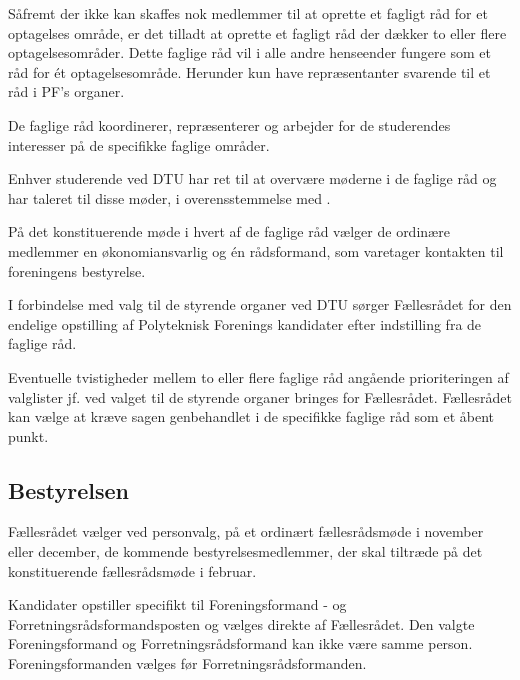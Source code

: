 \begin{list}
\item \label{L4:flereraad} Såfremt der ikke kan skaffes nok medlemmer til at oprette et fagligt råd for et optagelses område, er det tilladt at oprette et fagligt råd der dækker to eller flere optagelsesområder. Dette faglige råd vil i alle andre henseender fungere som et råd for ét optagelsesområde. Herunder kun have repræsentanter svarende til et råd i PF’s organer.

\item \label{L4:koordinering} De faglige råd koordinerer, repræsenterer og arbejder for de studerendes interesser på de specifikke faglige områder.

\item Enhver studerende ved DTU har ret til at overvære møderne i de faglige råd og har taleret til disse møder, i overensstemmelse med .

\item På det konstituerende møde i hvert af de faglige råd vælger de ordinære medlemmer en økonomiansvarlig og én rådsformand, som varetager kontakten til foreningens bestyrelse.

\item \label{L:faglige:DTUvalg} I forbindelse med valg til de styrende organer ved DTU sørger Fællesrådet for den endelige opstilling af Polyteknisk Forenings kandidater efter indstilling fra de faglige råd.

\item Eventuelle tvistigheder mellem to eller flere faglige råd angående prioriteringen af valglister jf.  ved valget til de styrende organer bringes for Fællesrådet. Fællesrådet kan vælge at kræve sagen genbehandlet i de specifikke faglige råd som et åbent punkt.



\subsection{Bestyrelsen}
\label{L:kap:bestyrelsen}
\item \label{L:best:valg} Fællesrådet vælger ved personvalg, på et ordinært fællesrådsmøde i november eller december, de kommende bestyrelsesmedlemmer, der skal tiltræde på det konstituerende fællesrådsmøde i februar. 

 Kandidater opstiller specifikt til Foreningsformand - og Forretningsrådsformandsposten og vælges direkte af Fællesrådet. Den valgte Foreningsformand og Forretningsrådsformand kan ikke være samme person. Foreningsformanden vælges før Forretningsrådsformanden.


\end{list}
